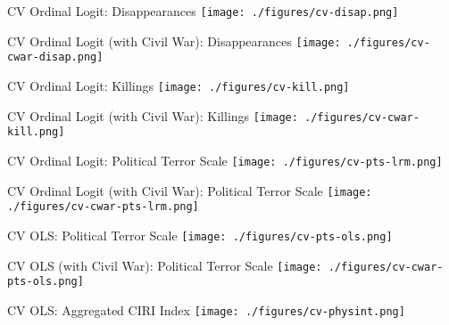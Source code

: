 \documentclass{beamer}
\begin{document}
\begin{frame}{CV Ordinal Logit: Disappearances}
  \centering
  \texttt{[image: ./figures/cv-disap.png]}
\end{frame}

\begin{frame}{CV Ordinal Logit (with Civil War): Disappearances}
  \centering
  \texttt{[image: ./figures/cv-cwar-disap.png]}
\end{frame}

\begin{frame}{CV Ordinal Logit: Killings}
  \centering
  \texttt{[image: ./figures/cv-kill.png]}
\end{frame}

\begin{frame}{CV Ordinal Logit (with Civil War): Killings}
  \centering
  \texttt{[image: ./figures/cv-cwar-kill.png]}
\end{frame}

\begin{frame}{CV Ordinal Logit: Political Terror Scale}
  \centering
  \texttt{[image: ./figures/cv-pts-lrm.png]}
\end{frame}

\begin{frame}{CV Ordinal Logit (with Civil War): Political Terror Scale}
  \centering
  \texttt{[image: ./figures/cv-cwar-pts-lrm.png]}
\end{frame}

\begin{frame}{CV OLS: Political Terror Scale}
  \centering
  \texttt{[image: ./figures/cv-pts-ols.png]}
\end{frame}

\begin{frame}{CV OLS (with Civil War): Political Terror Scale}
  \centering
  \texttt{[image: ./figures/cv-cwar-pts-ols.png]}
\end{frame}

\begin{frame}{CV OLS: Aggregated CIRI Index}
  \centering
  \texttt{[image: ./figures/cv-physint.png]}
\end{frame}
\end{document}
